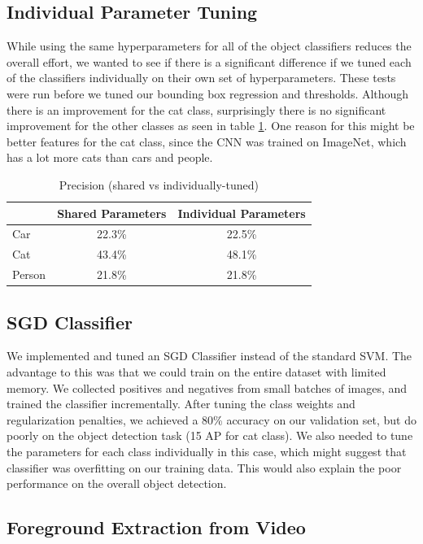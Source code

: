 \documentclass[10pt,twocolumn,letterpaper]{article}
\begin{document}
    
\subsection{Individual Parameter Tuning}
While using the same hyperparameters for all of the object classifiers reduces the overall effort, we wanted to see if there is a significant difference if we tuned each of the classifiers individually on their own set of hyperparameters. These tests were run before we tuned our bounding box regression and thresholds. Although there is an improvement for the cat class, surprisingly there is no significant improvement for the other classes as seen in table \ref{table:individual_params}. One reason for this might be better features for the cat class, since the CNN was trained on ImageNet, which has a lot more cats than cars and people. 
\begin{table}[h]
\centering
\begin{tabular}{lcc}
\hline
 & Shared Parameters & Individual Parameters  \\ \hline
Car & 22.3\% & 22.5\% \\
Cat & 43.4\% & 48.1\% \\
Person & 21.8\% & 21.8\% \\ \hline
\end{tabular}
\caption{Precision (shared vs individually-tuned)}
\label{table:individual_params}
\end{table}

\subsection{SGD Classifier}
We implemented and tuned an SGD Classifier instead of the standard SVM. The advantage to this was that we could train on the entire dataset with limited memory. We collected positives and negatives from small batches of images, and trained the classifier incrementally. After tuning the class weights and regularization penalties, we achieved a 80\% accuracy on our validation set, but do poorly on the object detection task (15 AP for cat class). We also needed to tune the parameters for each class individually in this case, which might suggest that classifier was overfitting on our training data. This would also explain the poor performance on the overall object detection.

\subsection{Foreground Extraction from Video}
\end{document}
